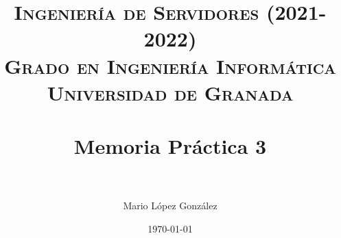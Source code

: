 

\title{	
\normalfont \normalsize 
\textsc{\textbf{Ingeniería de Servidores (2021-2022)} \\ Grado en Ingeniería Informática \\ Universidad de Granada} \\ [25pt] %
\horrule{0.5pt} \\[0.4cm] %
\huge Memoria Práctica 3 \\ %
\horrule{2pt} \\[0.5cm] %
}

\author{Mario López González} %

\date{\normalsize\today} %




\maketitle %

\newpage %

\tableofcontents %
\listoffigures %

\newpage




